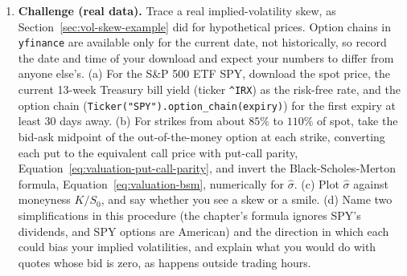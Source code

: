 \documentclass[../ai_in_finance]{subfiles}
\begin{document}
\begin{enumerate}[exercises]
    \item \textbf{Challenge (real data).} Trace a real implied-volatility skew, as Section~\ref{sec:vol-skew-example} did for hypothetical prices. Option chains in \texttt{yfinance} are available only for the current date, not historically, so record the date and time of your download and expect your numbers to differ from anyone else's. (a) For the S\&P 500 ETF SPY, download the spot price, the current 13-week Treasury bill yield (ticker \texttt{\^{}IRX}) as the risk-free rate, and the option chain (\texttt{Ticker("SPY").option\_chain(expiry)}) for the first expiry at least 30 days away. (b) For strikes from about $85\%$ to $110\%$ of spot, take the bid-ask midpoint of the out-of-the-money option at each strike, converting each put to the equivalent call price with put-call parity, Equation~\eqref{eq:valuation-put-call-parity}, and invert the Black-Scholes-Merton formula, Equation~\eqref{eq:valuation-bsm}, numerically for $\hat\sigma$. (c) Plot $\hat\sigma$ against moneyness $K/S_0$, and say whether you see a skew or a smile. (d) Name two simplifications in this procedure (the chapter's formula ignores SPY's dividends, and SPY options are American) and the direction in which each could bias your implied volatilities, and explain what you would do with quotes whose bid is zero, as happens outside trading hours.
\end{enumerate}

\end{document}
